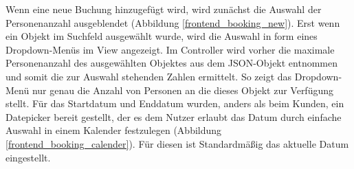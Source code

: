 
Wenn eine neue Buchung hinzugefügt wird, wird zunächst die Auswahl der Personenanzahl ausgeblendet (Abbildung \ref{frontend_booking_new}). Erst wenn ein Objekt im Suchfeld ausgewählt wurde, wird die Auswahl in form eines Dropdown-Menüs im View angezeigt. Im Controller wird vorher die maximale Personenanzahl des ausgewählten Objektes aus dem JSON-Objekt entnommen und somit die zur Auswahl stehenden Zahlen ermittelt. So zeigt das Dropdown-Menü nur genau die Anzahl von Personen an die dieses Objekt zur Verfügung stellt. Für das Startdatum und Enddatum wurden, anders als beim Kunden, ein Datepicker bereit gestellt, der es dem Nutzer erlaubt das Datum durch einfache Auswahl in einem Kalender festzulegen (Abbildung \ref{frontend_booking_calender}). Für diesen ist Standardmäßig das aktuelle Datum eingestellt.

